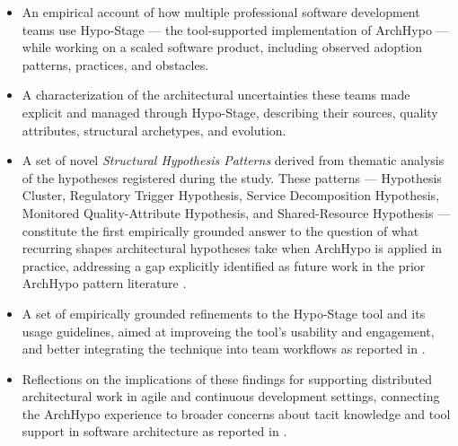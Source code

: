 \begin{itemize}
  \item An empirical account of how multiple professional software development teams use Hypo-Stage --- the tool-supported implementation of ArchHypo \citep{correa2025} --- while working on a scaled software product, including observed adoption patterns, practices, and obstacles.
  \item A characterization of the architectural uncertainties these teams made explicit and managed through Hypo-Stage, describing their sources, quality attributes, structural archetypes, and evolution.
  \item A set of novel \textit{Structural Hypothesis Patterns} derived from thematic analysis of the hypotheses registered during the study. These patterns --- Hypothesis Cluster, Regulatory Trigger Hypothesis, Service Decomposition Hypothesis, Monitored Quality-Attribute Hypothesis, and Shared-Resource Hypothesis --- constitute the first empirically grounded answer to the question of what recurring shapes architectural hypotheses take when ArchHypo is applied in practice, addressing a gap explicitly identified as future work in the prior ArchHypo pattern literature \citep{silva2024patterns}.
  \item A set of empirically grounded refinements to the Hypo-Stage tool and its usage guidelines, aimed at improveing the tool's usability and engagement, and better integrating the technique into team workflows as reported in \citet{correa2025}.
  \item Reflections on the implications of these findings for supporting distributed architectural work in agile and continuous development settings, connecting the ArchHypo experience to broader concerns about tacit knowledge and tool support in software architecture as reported in \citet{souza2019,infoq2024trends}.
\end{itemize}

